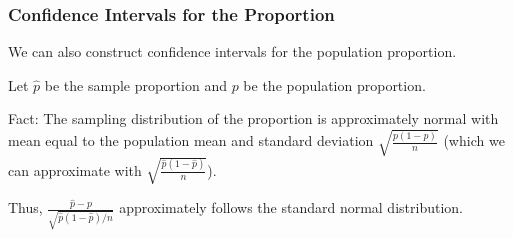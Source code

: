 \documentclass[11pt, table]{beamer}
\begin{document}
\begin{frame}
\frametitle{Confidence Intervals for the Proportion}
We can also construct confidence intervals for the population proportion.
\vspace{0.1in}

Let $\hat{p}$ be the sample proportion and $p$ be the population proportion.
\vspace{0.1in}

Fact: The sampling distribution of the proportion is approximately normal with mean equal to the population mean and standard deviation $\sqrt{\frac{p(1-p)}{n}}$ (which we can approximate with $\sqrt{\frac{\hat{p}(1 - \hat{p})}{n}}$).
\vspace{0.1in}

Thus, $\frac{\hat{p} - p}{\sqrt{\hat{p}(1 - \hat{p}) / n}}$ approximately follows the standard normal distribution.

\end{frame}
\end{document}
